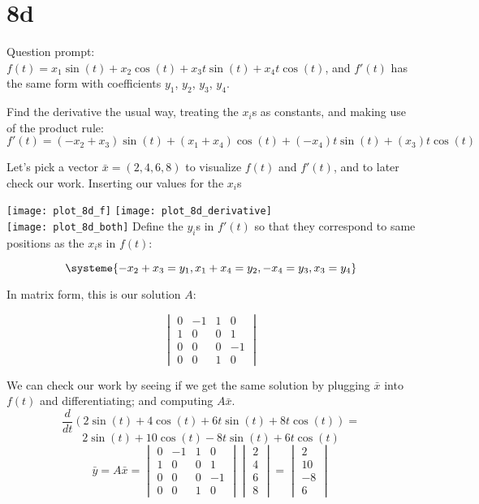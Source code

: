 \documentclass[12pt]{article}
\begin{document}
\section{8d}
Question prompt: $f(t) = x_1\sin(t) + x_2\cos(t) + x_3t\sin(t) + x_4t\cos(t)$,
and $f'(t)$ has the same form with coefficients $y_1$, $y_2$, $y_3$, $y_4$.

Find the derivative the usual way, treating the $x_i$s as constants, and making use of the product
rule: \\

\[
f'(t) = (-x_2 + x_3)\sin(t) + (x_1 + x_4)\cos(t) + (-x_4)t\sin(t) + (x_3)t\cos(t)
\]

Let's pick a vector $\bar{x}=(2,4,6,8)$ to visualize $f(t)$ and $f'(t)$, and to later check our
work. Inserting our values for the $x_i$s

\texttt{[image: plot\_8d\_f]} \texttt{[image: plot\_8d\_derivative]} \\
\texttt{[image: plot\_8d\_both]}
Define the $y_i$s in $f'(t)$ so that they correspond to same positions as the $x_i$s in $f(t)$:

\[
\systeme{-x_2 + x_3 = y_1, x_1 + x_4 = y_2, -x_4 = y_3,x_3 = y_4}
\]

In matrix form, this is our solution $A$:

\[
\begin{vmatrix}
  0 & -1 & 1 & 0 \\
  1 & 0 & 0 & 1 \\
  0 & 0 & 0 & -1 \\
  0 & 0 & 1 & 0 
\end{vmatrix}
\]

We can check our work by seeing if we get the same solution by plugging
$\bar{x}$ into $f(t)$ and differentiating; and computing $A\bar{x}$. 
\[
  \frac{d}{dt}(2\sin(t)+4\cos(t)+6t\sin(t)+8t\cos(t)) = 
\]
\[
  2\sin(t)+10\cos(t)-8t\sin(t)+6t\cos(t)
\]
\bigbreak{}
\[
  \bar{y} = A\bar{x} = 
  \begin{vmatrix}
    0 & -1 & 1 & 0 \\
    1 & 0 & 0 & 1 \\
    0 & 0 & 0 & -1 \\
    0 & 0 & 1 & 0 
    \end{vmatrix}
  \begin{vmatrix} 2 \\ 4 \\ 6 \\ 8\end{vmatrix} = 
  \begin{vmatrix} 2 \\ 10 \\ -8 \\ 6 \end{vmatrix}
\]
\end{document}
